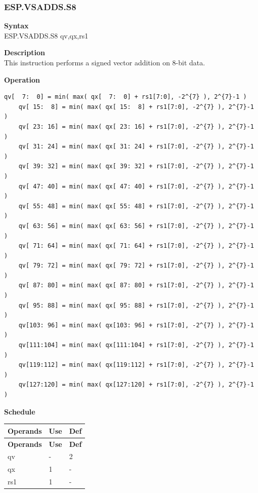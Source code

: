 \newpage
\subsubsection{ESP.VSADDS.S8}\label{instruction:ESPVSADDSS8}
\textbf{Syntax}\\
ESP.VSADDS.S8 qv,qx,rs1

\textbf{Description}\\
This instruction performs a signed vector addition on 8-bit data.

\textbf{Operation}\\
\begin{lstlisting}[escapeinside=`?]
    qv[  7:  0] = min( max( qx[  7:  0] + rs1[7:0], -2^{7} ), 2^{7}-1 )
    qv[ 15:  8] = min( max( qx[ 15:  8] + rs1[7:0], -2^{7} ), 2^{7}-1 )
    qv[ 23: 16] = min( max( qx[ 23: 16] + rs1[7:0], -2^{7} ), 2^{7}-1 )
    qv[ 31: 24] = min( max( qx[ 31: 24] + rs1[7:0], -2^{7} ), 2^{7}-1 )
    qv[ 39: 32] = min( max( qx[ 39: 32] + rs1[7:0], -2^{7} ), 2^{7}-1 )
    qv[ 47: 40] = min( max( qx[ 47: 40] + rs1[7:0], -2^{7} ), 2^{7}-1 )
    qv[ 55: 48] = min( max( qx[ 55: 48] + rs1[7:0], -2^{7} ), 2^{7}-1 )
    qv[ 63: 56] = min( max( qx[ 63: 56] + rs1[7:0], -2^{7} ), 2^{7}-1 )
    qv[ 71: 64] = min( max( qx[ 71: 64] + rs1[7:0], -2^{7} ), 2^{7}-1 )
    qv[ 79: 72] = min( max( qx[ 79: 72] + rs1[7:0], -2^{7} ), 2^{7}-1 )
    qv[ 87: 80] = min( max( qx[ 87: 80] + rs1[7:0], -2^{7} ), 2^{7}-1 )
    qv[ 95: 88] = min( max( qx[ 95: 88] + rs1[7:0], -2^{7} ), 2^{7}-1 )
    qv[103: 96] = min( max( qx[103: 96] + rs1[7:0], -2^{7} ), 2^{7}-1 )
    qv[111:104] = min( max( qx[111:104] + rs1[7:0], -2^{7} ), 2^{7}-1 )
    qv[119:112] = min( max( qx[119:112] + rs1[7:0], -2^{7} ), 2^{7}-1 )
    qv[127:120] = min( max( qx[127:120] + rs1[7:0], -2^{7} ), 2^{7}-1 )
\end{lstlisting}

\textbf{Schedule}\\
\begin{longtable}[c]{|l|l|l|}
    \hline
    \rowcolor{lightgray}
    \textbf{Operands} & \textbf{Use} & \textbf{Def} \\\hline
    \endfirsthead
    \hline
    \rowcolor{lightgray}
     \textbf{Operands} & \textbf{Use} & \textbf{Def} \\\hline
    \endhead
    \hline
    \endfoot

  qv & - & 2 \\\hline
    qx & 1 & - \\\hline
    rs1 & 1 & -

\end{longtable}

